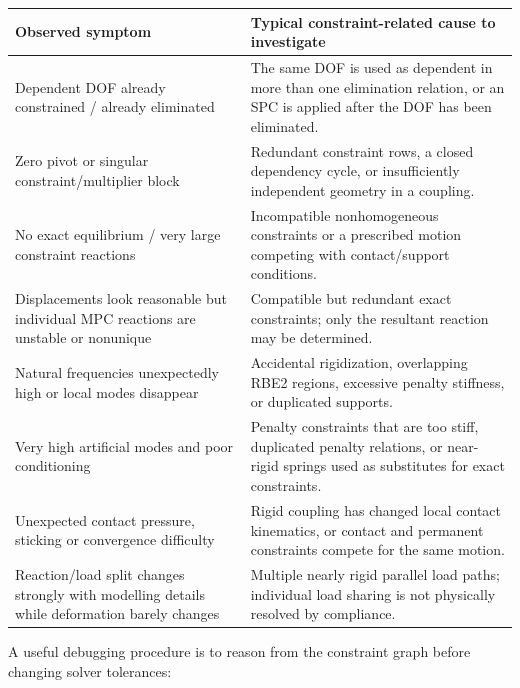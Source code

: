 \begin{center}
\small
\begin{tabular}{|p{}|p{}|}
\hline
\textbf{Observed symptom} & \textbf{Typical constraint-related cause to investigate} \\
\hline
Dependent DOF already constrained / already eliminated & The same DOF is used as dependent in more than one elimination relation, or an SPC is applied after the DOF has been eliminated. \\
\hline
Zero pivot or singular constraint/multiplier block & Redundant constraint rows, a closed dependency cycle, or insufficiently independent geometry in a coupling. \\
\hline
No exact equilibrium / very large constraint reactions & Incompatible nonhomogeneous constraints or a prescribed motion competing with contact/support conditions. \\
\hline
Displacements look reasonable but individual MPC reactions are unstable or nonunique & Compatible but redundant exact constraints; only the resultant reaction may be determined. \\
\hline
Natural frequencies unexpectedly high or local modes disappear & Accidental rigidization, overlapping RBE2 regions, excessive penalty stiffness, or duplicated supports. \\
\hline
Very high artificial modes and poor conditioning & Penalty constraints that are too stiff, duplicated penalty relations, or near-rigid springs used as substitutes for exact constraints. \\
\hline
Unexpected contact pressure, sticking or convergence difficulty & Rigid coupling has changed local contact kinematics, or contact and permanent constraints compete for the same motion. \\
\hline
Reaction/load split changes strongly with modelling details while deformation barely changes & Multiple nearly rigid parallel load paths; individual load sharing is not physically resolved by compliance. \\
\hline
\end{tabular}
\label{tab:constraint-interaction-diagnostics}
\end{center}

A useful debugging procedure is to reason from the constraint graph before
changing solver tolerances:

